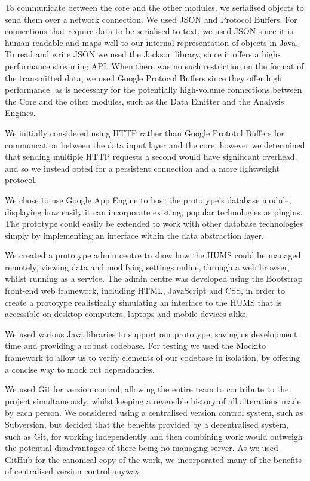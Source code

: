 \documentclass[10pt,a4paper]{article}
\begin{document}
To communicate between the core and the other modules, we serialised objects to send them over a network connection. We used JSON and Protocol Buffers. For connections that require data to be serialised to text, we used JSON since it is human readable and maps well to our internal representation of objects in Java. To read and write JSON we used the Jackson library, since it offers a high-performance streaming API. When there was no such restriction on the format of the transmitted data, we used Google Protocol Buffers since they offer high performance, as is necessary for the potentially high-volume connections between the Core and the other modules, such as the Data Emitter and the Analysis Engines.

We initially considered using HTTP rather than Google Prototol Buffers for
communcation between the data input layer and the core, however we determined
that sending multiple HTTP requests a second would have significant overhead,
and so we instead opted for a persistent connection and a more lightweight
protocol.

We chose to use Google App Engine to host the prototype's database
module, displaying how easily it can incorporate existing, popular
technologies as plugins. The prototype could easily be extended to
work with other database technologies simply by implementing an
interface within the data abstraction layer.

We created a prototype admin centre to show how the HUMS could be
managed remotely, viewing data and modifying settings online, through
a web browser, whilst running as a service. The admin centre was
developed using the Bootstrap front-end web framework, including 
HTML, JavaScript and CSS, in order to create a prototype realistically
simulating an interface to the HUMS that is accessible on desktop
computers, laptops and mobile devices alike.

We used various Java libraries to support our prototype, saving us 
development time and providing a robust codebase. For testing we used 
the Mockito framework to allow us to verify elements of our codebase in 
isolation, by offering a concise way to mock out dependancies.

We used Git for version control, allowing the entire team to
contribute to the project simultaneously, whilst keeping a reversible
history of all alterations made by each person. We considered using a
centralised version control system, such as Subversion, but decided that the
benefits provided by a decentralised system, such as Git, for working
independently and then combining work would outweigh the potential
disadvantages of there being no managing server. As we used GitHub for the
canonical copy of the work, we incorporated many of the benefits of centralised
version control anyway.
\end{document}
